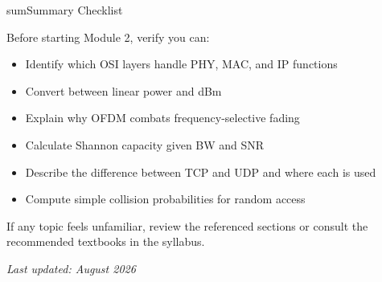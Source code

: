 \begin{CNbox}[unbreakable]{sum}{Summary Checklist}

Before starting Module 2, verify you can:

\begin{itemize}
\tightlist
\item
  \CNcheckbox{} Identify which OSI layers handle PHY, MAC, and IP functions
\item
  \CNcheckbox{} Convert between linear power and dBm
\item
  \CNcheckbox{} Explain why OFDM combats frequency-selective fading
\item
  \CNcheckbox{} Calculate Shannon capacity given BW and SNR
\item
  \CNcheckbox{} Describe the difference between TCP and UDP and where each is used
\item
  \CNcheckbox{} Compute simple collision probabilities for random access
\end{itemize}

If any topic feels unfamiliar, review the referenced sections or consult the recommended textbooks in the syllabus.

\emph{Last updated: August 2026}

\end{CNbox}
